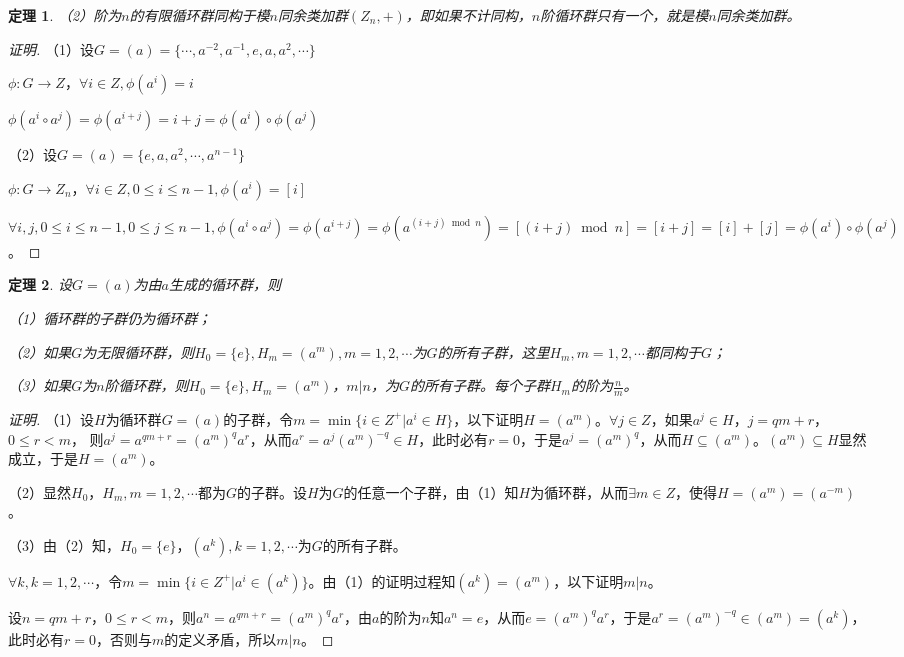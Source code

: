 \documentclass{article}
\newtheorem{Thm}{定理}
\begin{document}
\begin{CJK*}{UTF8}{gbsn}
\begin{Thm}
    （2）阶为$n$的有限循环群同构于模$n$同余类加群$(Z_n,+)$，即如果不计同构，$n$阶循环群只有一个，就是模$n$同余类加群。
  \end{Thm}
  \begin{proof}[证明]
    （1）设$G=(a)=\{\cdots,a^{-2},a^{-1},e,a,a^2,\cdots\}$
  
    $\phi:G\to Z$，$\forall i\in Z, \phi(a^i)=i$
  
    $\phi(a^i\circ a^j)=\phi(a^{i+j})=i+j=\phi(a^i)\circ\phi(a^j)$
  
    （2）设$G=(a)=\{e,a,a^2,\cdots,a^{n-1}\}$
  
    $\phi:G\to Z_n$，$\forall i\in Z, 0\leq i\leq n-1,\phi(a^i)=[i]$
  
    $\forall i,j, 0\leq i\leq n-1,0\leq j\leq n-1,\phi(a^i\circ a^j)=\phi(a^{i+j})=\phi(a^{(i+j)\bmod n})=[(i+j)\bmod n]=[i+j]=[i]+[j]=\phi(a^i)\circ \phi(a^j)$。
  
  \end{proof}
  \begin{Thm}
    设$G=(a)$为由$a$生成的循环群，则
  
    （1）循环群的子群仍为循环群；
  
    （2）如果$G$为无限循环群，则$H_0=\{e\},H_m=(a^m),m=1,2,\cdots$为$G$的所有子群，这里$H_m,m=1,2,\cdots$都同构于$G$；
  
    （3）如果$G$为$n$阶循环群，则$H_0=\{e\},H_m=(a^m)$，$m|n$，为$G$的所有子群。每个子群$H_m$的阶为$\frac{n}{m}$。
  \end{Thm}
  \begin{proof}[证明]
    （1）设$H$为循环群$G=(a)$的子群，令$m=\min \{i\in Z^+|a^i\in H\}$，以下证明$H=(a^{m})$。$\forall j\in Z$，如果$a^j\in H$，$j=qm+r$，$0\leq r < m$，
    则$a^j=a^{qm+r}=(a^m)^qa^r$，从而$a^r=a^j(a^{m})^{-q}\in H$，此时必有$r=0$，于是$a^j=(a^m)^q$，从而$H\subseteq (a^m)$。$(a^m)\subseteq H$显然成立，于是$H=(a^m)$。
  
    （2）显然$H_0$，$H_m,m=1,2,\cdots$都为$G$的子群。设$H$为$G$的任意一个子群，由（1）知$H$为循环群，从而$\exists m\in Z$，使得$H=(a^m)=(a^{-m})$。
  
    （3）由（2）知，$H_0=\{e\}$，$(a^k),k=1,2,\cdots$为$G$的所有子群。
  
    $\forall k,k=1,2,\cdots$，令$m=\min \{i\in Z^+|a^i\in (a^k)\}$。由（1）的证明过程知$(a^k)=(a^m)$，以下证明$m|n$。
  
    设$n=qm+r$，$0\leq r < m$，则$a^n=a^{qm+r}=(a^m)^qa^r$，由$a$的阶为$n$知$a^n=e$，从而$e=(a^m)^qa^r$，于是$a^r=(a^m)^{-q}\in (a^m)=(a^k)$，此时必有$r=0$，否则与$m$的定义矛盾，所以$m|n$。
  

\end{proof}
\end{CJK*}
\end{document}
